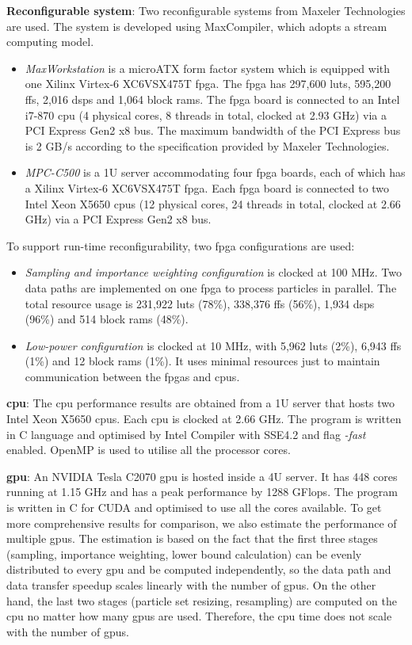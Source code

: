 \textbf{Reconfigurable system}: Two reconfigurable systems from Maxeler Technologies are used.
The system is developed using MaxCompiler, which adopts a stream computing model.
\begin{itemize}
\item \textit{MaxWorkstation} is a microATX form factor system which is equipped with one Xilinx Virtex-6 XC6VSX475T \gls{fpga}.
The \gls{fpga} has 297,600 \glspl{lut}, 595,200 \glspl{ff}, 2,016 \glspl{dsp} and 1,064 block \glspl{ram}. 
The \gls{fpga} board is connected to an Intel i7-870 \gls{cpu} (4 physical cores, 8 threads in total, clocked at 2.93 GHz) via a PCI Express Gen2 x8 bus.
The maximum bandwidth of the PCI Express bus is 2 GB/s according to the specification provided by Maxeler Technologies.
\item \textit{MPC-C500} is a 1U server accommodating four \gls{fpga} boards, each of which has a Xilinx Virtex-6 XC6VSX475T \gls{fpga}.
Each \gls{fpga} board is connected to two Intel Xeon X5650 \glspl{cpu} (12 physical cores, 24 threads in total, clocked at 2.66 GHz) via a PCI Express Gen2 x8 bus.
\end{itemize}

To support run-time reconfigurability, two \gls{fpga} configurations are used:
\begin{itemize}
\item {\it Sampling and importance weighting configuration} is clocked at 100 MHz.
Two data paths are implemented on one \gls{fpga} to process particles in parallel.
The total resource usage is 231,922 \glspl{lut} (78\%), 338,376 \glspl{ff} (56\%), 1,934 \glspl{dsp} (96\%) and 514 block \glspl{ram} (48\%).
\item {\it Low-power configuration} is clocked at 10 MHz, with 5,962 \glspl{lut} (2\%), 6,943 \glspl{ff} (1\%) and 12 block \glspl{ram} (1\%).
It uses minimal resources just to maintain communication between the \glspl{fpga} and \glspl{cpu}.
\end{itemize}

\textbf{\gls{cpu}}: The \gls{cpu} performance results are obtained from a 1U server that hosts two Intel Xeon X5650 \glspl{cpu}. 
Each \gls{cpu} is clocked at 2.66 GHz.
The program is written in C language and optimised by Intel Compiler with SSE4.2 and flag {\it -fast} enabled.
OpenMP is used to utilise all the processor cores.

\textbf{\gls{gpu}}: An NVIDIA Tesla C2070 \gls{gpu} is hosted inside a 4U server.
It has 448 cores running at 1.15 GHz and has a peak performance by 1288 GFlops.
The program is written in C for CUDA and optimised to use all the cores available.
To get more comprehensive results for comparison, we also estimate the performance of multiple \gls{gpu}s.
The estimation is based on the fact that the first three stages (sampling, importance weighting, lower bound calculation) can be evenly distributed to every \gls{gpu} and be computed independently, 
so the data path and data transfer speedup scales linearly with the number of \gls{gpu}s.
On the other hand, the last two stages (particle set resizing, resampling) are computed on the \gls{cpu} no matter how many \gls{gpu}s are used.
Therefore, the \gls{cpu} time does not scale with the number of \gls{gpu}s.

